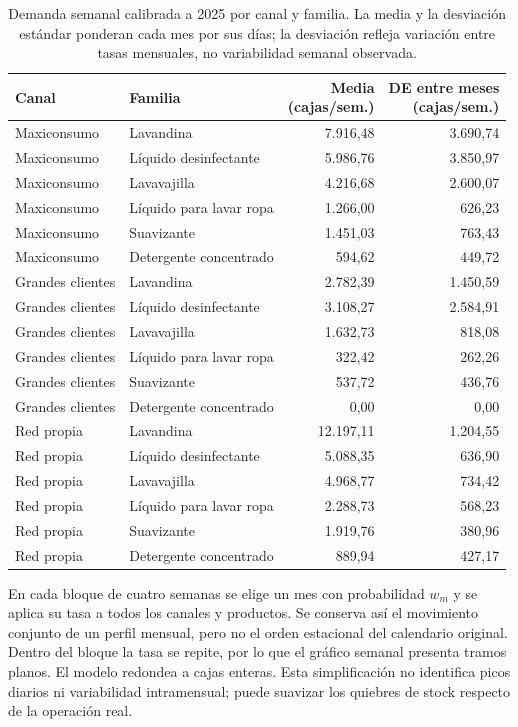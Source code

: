 \documentclass[11pt, a4paper]{article}
\begin{document}
\begin{table}[htbp]
\centering
\caption{Demanda semanal calibrada a 2025 por canal y familia. La media y la desviación estándar ponderan cada mes por sus días; la desviación refleja variación entre tasas mensuales, no variabilidad semanal observada.}
\label{tab:demanda_calibrada}
\small
\setlength{\tabcolsep}{3pt}
\begin{tabularx}{\textwidth}{lXrr}
\toprule
Canal & Familia & \shortstack[r]{Media\\(cajas/sem.)} & \shortstack[r]{DE entre meses\\(cajas/sem.)} \\
\midrule
Maxiconsumo & Lavandina & 7.916,48 & 3.690,74 \\
Maxiconsumo & Líquido desinfectante & 5.986,76 & 3.850,97 \\
Maxiconsumo & Lavavajilla & 4.216,68 & 2.600,07 \\
Maxiconsumo & Líquido para lavar ropa & 1.266,00 & 626,23 \\
Maxiconsumo & Suavizante & 1.451,03 & 763,43 \\
Maxiconsumo & Detergente concentrado & 594,62 & 449,72 \\
Grandes clientes & Lavandina & 2.782,39 & 1.450,59 \\
Grandes clientes & Líquido desinfectante & 3.108,27 & 2.584,91 \\
Grandes clientes & Lavavajilla & 1.632,73 & 818,08 \\
Grandes clientes & Líquido para lavar ropa & 322,42 & 262,26 \\
Grandes clientes & Suavizante & 537,72 & 436,76 \\
Grandes clientes & Detergente concentrado & 0,00 & 0,00 \\
Red propia & Lavandina & 12.197,11 & 1.204,55 \\
Red propia & Líquido desinfectante & 5.088,35 & 636,90 \\
Red propia & Lavavajilla & 4.968,77 & 734,42 \\
Red propia & Líquido para lavar ropa & 2.288,73 & 568,23 \\
Red propia & Suavizante & 1.919,76 & 380,96 \\
Red propia & Detergente concentrado & 889,94 & 427,17 \\
\bottomrule
\end{tabularx}
\end{table}

En cada bloque de cuatro semanas se elige un mes con probabilidad $w_m$ y se aplica su tasa a todos los canales y productos. Se conserva así el movimiento conjunto de un perfil mensual, pero no el orden estacional del calendario original. Dentro del bloque la tasa se repite, por lo que el gráfico semanal presenta tramos planos. El modelo redondea a cajas enteras. Esta simplificación no identifica picos diarios ni variabilidad intramensual; puede suavizar los quiebres de stock respecto de la operación real.
\end{document}
